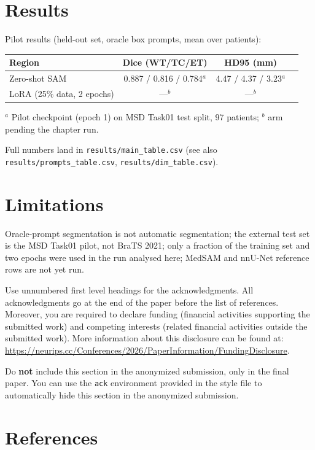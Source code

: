 \documentclass{article}
\begin{document}
\section*{Results}

Pilot results (held-out set, oracle box prompts, mean over patients):

\begin{tabular}{lccc}
  \toprule
  Region & Dice (WT/TC/ET) & HD95 (mm) \\
  \midrule
  Zero-shot SAM & 0.887 / 0.816 / 0.784$^a$ & 4.47 / 4.37 / 3.23$^a$ \\
  \midrule
  LoRA (25\% data, 2 epochs) & ---$^b$ & ---$^b$ \\
  \bottomrule
\end{tabular}

$^a$ Pilot checkpoint (epoch 1) on MSD Task01 test split, 97 patients; $^b$ arm pending the
chapter run.

Full numbers land in \texttt{results/main_table.csv} (see also \texttt{results/prompts_table.csv},
\texttt{results/dim_table.csv}).

\section*{Limitations}

Oracle-prompt segmentation is not automatic segmentation; the external test set is the MSD
Task01 pilot, not BraTS 2021; only a fraction of the training set and two epochs were used in the
run analysed here; MedSAM and nnU-Net reference rows are not yet run.

\begin{ack}
Use unnumbered first level headings for the acknowledgments. All acknowledgments go at the end of
the paper before the list of references. Moreover, you are required to declare funding (financial
activities supporting the submitted work) and competing interests (related financial activities
outside the submitted work). More information about this disclosure can be found at:
\url{https://neurips.cc/Conferences/2026/PaperInformation/FundingDisclosure}.

Do {\bf not} include this section in the anonymized submission, only in the final paper. You can
use the \texttt{ack} environment provided in the style file to automatically hide this section in
the anonymized submission.
\end{ack}

\section*{References}



\end{document}

